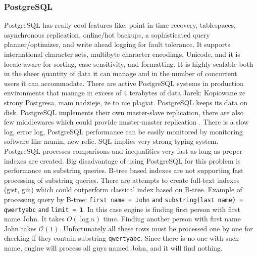 \documentclass[10pt,a4paper]{article}
\newcommand{\jarek}[1]{\noindent\colorbox{myYellow}{Jarek: #1}}
\newcommand{\Oh}{\mathcal{O}}
\begin{document}
\subsubsection{PostgreSQL}
PostgreSQL has really cool features like: point in time recovery, tablespaces, asynchronous replication, online/hot backups, a sophisticated query planner/optimizer, and write ahead logging for fault tolerance. It supports international character sets, multibyte character encodings, Unicode, and it is locale-aware for sorting, case-sensitivity, and formatting. It is highly scalable both in the sheer quantity of data it can manage and in the number of concurrent users it can accommodate. There are active PostgreSQL systems in production environments that manage in excess of 4 terabytes of data \jarek{Kopiowane ze strony Postgresa, mam nadzieje, że to nie plagiat}.
PostgreSQL keeps its data on disk. PostgreSQL implements their own master-slave replication, there are also few middlewares which could provide master-master replication \cite{PSQLREPL}. There is a slow log, error log, PostgreSQL performance can be easily monitored by monitoring software like munin, new relic. SQL implies very strong typing system. PostgreSQL processes comparisons and inequalities very fast as long as proper indexes are created. Big disadvantage of using PostgreSQL for this problem is performance on substring queries. B-tree based indexes are not supporting fast processing of substring queries. There are attempts to create full-text indexes (gist, gin) which could outperform classical index based on B-tree.
Example of processing query by B-tree: \verb|first name = John| \verb|and| \verb|substring(last name) = qwertyabc| \verb|and| \verb|limit = 1|. In this case engine is finding first person with first name John. It takes $O(\log n)$ time. Finding another person with first name John takes $\Oh(1)$. Unfortunately all these rows must be processed one by one for checking if they contain substring \verb|qwertyabc|. Since there is no one with such name, engine will process all guys named John, and it will find nothing.
\end{document}

